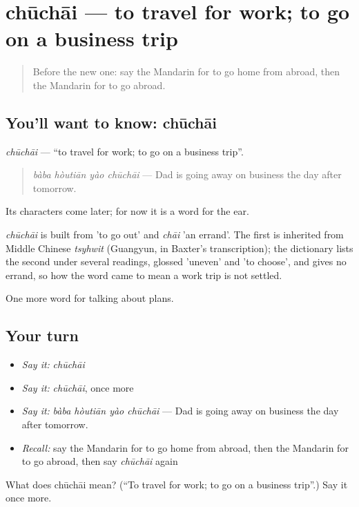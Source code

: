 \section[chūchāi]{chūchāi — to travel for work; to go on a business trip}

\label{lesson:ZH-C191-chuchai}



\begin{quote}
Before the new one: say the Mandarin for to go home from abroad, then the Mandarin for to go abroad.
\end{quote}

\subsection*{You'll want to know: chūchāi}
\emph{chūchāi} — \textquotedblleft{}to travel for work; to go on a business trip\textquotedblright{}.

\begin{quote}
\emph{bàba hòutiān yào chūchāi} — Dad is going away on business the day after tomorrow.
\end{quote}

Its characters come later; for now it is a word for the ear.

\begin{cousinweb}
\emph{chūchāi} is built from  'to go out' and \emph{chāi} 'an errand'. The first is inherited from Middle Chinese \emph{tsyhwit} (Guangyun, in Baxter's transcription); the dictionary lists the second under several readings, glossed 'uneven' and 'to choose', and gives no errand, so how the word came to mean a work trip is not settled.
\end{cousinweb}

\begin{grammarlens}[title={What you've built}]
One more word for talking about plans.
\end{grammarlens}

\subsection*{Your turn}
\begin{itemize}
\raggedright
  \item \emph{Say it:} \emph{chūchāi}
  \item \emph{Say it:} \emph{chūchāi}, once more
  \item \emph{Say it:} \emph{bàba hòutiān yào chūchāi} — Dad is going away on business the day after tomorrow.
  \item \emph{Recall:} say the Mandarin for to go home from abroad, then the Mandarin for to go abroad, then say \emph{chūchāi} again
\end{itemize}

\begin{tcolorbox}[breakable,colback=teal!4,colframe=teal!35!black,title={Before you move on}]
What does chūchāi mean? (\textquotedblleft{}To travel for work; to go on a business trip\textquotedblright{}.) Say it once more.
\end{tcolorbox}

